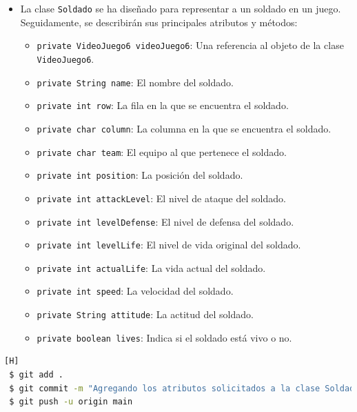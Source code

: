 \documentclass{article}
\begin{document}
\begin{itemize}	
    \item La clase \texttt{Soldado} se ha diseñado para representar a un soldado en un juego. Seguidamente, se describirán sus principales atributos y métodos:
    \begin{itemize}
        \item \texttt{private VideoJuego6 videoJuego6}: Una referencia al objeto de la clase \texttt{VideoJuego6}.
        \item \texttt{private String name}: El nombre del soldado.
        \item \texttt{private int row}: La fila en la que se encuentra el soldado.
        \item \texttt{private char column}: La columna en la que se encuentra el soldado.
        \item \texttt{private char team}: El equipo al que pertenece el soldado.
        \item \texttt{private int position}: La posición del soldado.
        \item \texttt{private int attackLevel}: El nivel de ataque del soldado.
        \item \texttt{private int levelDefense}: El nivel de defensa del soldado.
        \item \texttt{private int levelLife}: El nivel de vida original del soldado.
        \item \texttt{private int actualLife}: La vida actual del soldado.
        \item \texttt{private int speed}: La velocidad del soldado.
        \item \texttt{private String attitude}: La actitud del soldado.
        \item \texttt{private boolean lives}: Indica si el soldado está vivo o no.
    \end{itemize}
\end{itemize}
    

\begin{lstlisting}[language=bash,caption={Commit \href{https://github.com/hernanchoquehuanca/fp2-23b/commit/903d1c98abd3dedb3b72249a8f0d12acd297bfa2}{903d1c9}: Agregando los atributos solicitados a la clase Soldado}][H]
 $ git add .
 $ git commit -m "Agregando los atributos solicitados a la clase Soldado"			
 $ git push -u origin main
\end{lstlisting}
\end{document}
